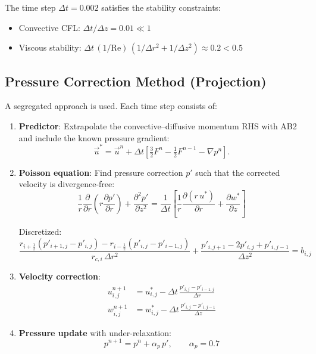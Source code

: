 \documentclass[12pt,a4paper]{article}
\newcommand{\parder}[2]{\frac{\partial #1}{\partial #2}}
\newcommand{\pparder}[2]{\frac{\partial^2 #1}{\partial {#2}^2}}
\newcommand{\Rey}{\text{Re}}
\begin{document}
The time step $\Delta t = 0.002$ satisfies the stability constraints:
\begin{itemize}
    \item Convective CFL: $\Delta t / \Delta z = 0.01 \ll 1$
    \item Viscous stability: $\Delta t\,(1/\Rey)\,(1/\Delta r^2 + 1/\Delta z^2) \approx 0.2 < 0.5$
\end{itemize}

\subsection{Pressure Correction Method (Projection)}

A segregated approach is used. Each time step consists of:

\begin{enumerate}
    \item \textbf{Predictor}: Extrapolate the convective--diffusive momentum
    RHS with AB2 and include the known pressure gradient:
    \begin{equation}
        \vec{u}^{*}=\vec{u}^{n}+\Delta t\left[
        \tfrac{3}{2}F^n-\tfrac{1}{2}F^{n-1}-\nabla p^n\right].
    \end{equation}

    \item \textbf{Poisson equation}: Find pressure correction $p'$ such that the corrected velocity is divergence-free:
    \begin{equation}
        \frac{1}{r}\parder{}{r}\!\left(r\parder{p'}{r}\right) + \pparder{p'}{z}
        = \frac{1}{\Delta t}\left[\frac{1}{r}\parder{(r\,u^*)}{r} + \parder{w^*}{z}\right]
        \label{eq:poisson}
    \end{equation}

    Discretized:
    \begin{equation}
        \frac{r_{i+\frac{1}{2}}(p'_{i+1,j}-p'_{i,j}) - r_{i-\frac{1}{2}}(p'_{i,j}-p'_{i-1,j})}{r_{c,i}\,\Delta r^2}
        + \frac{p'_{i,j+1} - 2p'_{i,j} + p'_{i,j-1}}{\Delta z^2}
        = b_{i,j}
    \end{equation}

    \item \textbf{Velocity correction}:
    \begin{align}
        u^{n+1}_{i,j} &= u^*_{i,j} - \Delta t\,\frac{p'_{i,j} - p'_{i-1,j}}{\Delta r} \\
        w^{n+1}_{i,j} &= w^*_{i,j} - \Delta t\,\frac{p'_{i,j} - p'_{i,j-1}}{\Delta z}
    \end{align}

    \item \textbf{Pressure update} with under-relaxation:
    \begin{equation}
        p^{n+1} = p^n + \alpha_p\,p', \qquad \alpha_p = 0.7
    \end{equation}
\end{enumerate}
\end{document}
